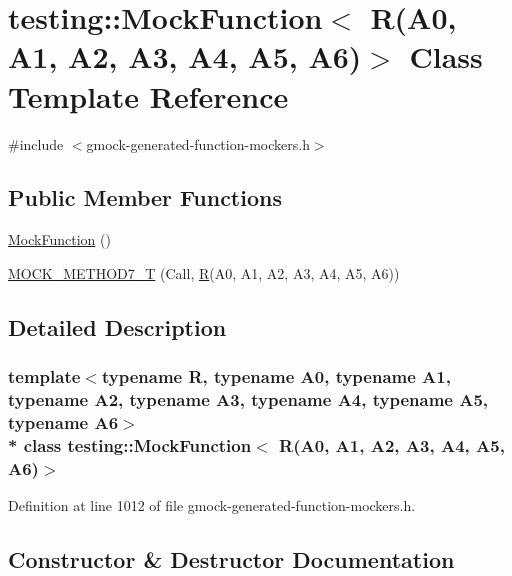 \hypertarget{classtesting_1_1_mock_function_3_01_r_07_a0_00_01_a1_00_01_a2_00_01_a3_00_01_a4_00_01_a5_00_01_a6_08_4}{}\section{testing\+:\+:Mock\+Function$<$ R(A0, A1, A2, A3, A4, A5, A6)$>$ Class Template Reference}
\label{classtesting_1_1_mock_function_3_01_r_07_a0_00_01_a1_00_01_a2_00_01_a3_00_01_a4_00_01_a5_00_01_a6_08_4}


{\ttfamily \#include $<$gmock-\/generated-\/function-\/mockers.\+h$>$}

\subsection*{Public Member Functions}
\begin{DoxyCompactItemize}
\item 
\hyperlink{classtesting_1_1_mock_function_3_01_r_07_a0_00_01_a1_00_01_a2_00_01_a3_00_01_a4_00_01_a5_00_01_a6_08_4_a6d91c54d0d03b96fd08a852fb40a57d8}{Mock\+Function} ()
\item 
\hyperlink{classtesting_1_1_mock_function_3_01_r_07_a0_00_01_a1_00_01_a2_00_01_a3_00_01_a4_00_01_a5_00_01_a6_08_4_a965d96b3e212c5bd0391302fcee943d6}{M\+O\+C\+K\+\_\+\+M\+E\+T\+H\+O\+D7\+\_\+T} (Call, \hyperlink{typedefs__9_8js_afb423b73ee7b6c04d2d54fc06e405404}{R}(A0, A1, A2, A3, A4, A5, A6))
\end{DoxyCompactItemize}


\subsection{Detailed Description}
\subsubsection*{template$<$typename R, typename A0, typename A1, typename A2, typename A3, typename A4, typename A5, typename A6$>$\\*
class testing\+::\+Mock\+Function$<$ R(\+A0, A1, A2, A3, A4, A5, A6)$>$}



Definition at line 1012 of file gmock-\/generated-\/function-\/mockers.\+h.



\subsection{Constructor \& Destructor Documentation}

